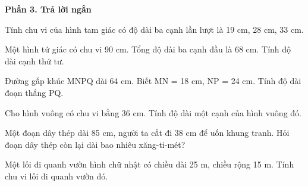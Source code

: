 \textbf{Phần 3. Trả lời ngắn}

\begin{ex} %
Tính chu vi của hình tam giác có độ dài ba cạnh lần lượt là 19 cm, 28 cm, 33 cm.
\end{ex}

\begin{ex} %
Một hình tứ giác có chu vi 90 cm. Tổng độ dài ba cạnh đầu là 68 cm. Tính độ dài cạnh thứ tư.
\end{ex}

\begin{ex} %
Đường gấp khúc MNPQ dài 64 cm. Biết MN = 18 cm, NP = 24 cm. Tính độ dài đoạn thẳng PQ.
\end{ex}

\begin{ex} %
Cho hình vuông có chu vi bằng 36 cm. Tính độ dài một cạnh của hình vuông đó.
\end{ex}

\begin{ex} %
Một đoạn dây thép dài 85 cm, người ta cắt đi 38 cm để uốn khung tranh. Hỏi đoạn dây thép còn lại dài bao nhiêu xăng-ti-mét?
\end{ex}

\begin{ex} %
Một lối đi quanh vườn hình chữ nhật có chiều dài 25 m, chiều rộng 15 m. Tính chu vi lối đi quanh vườn đó.
\end{ex}
